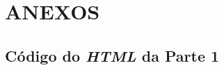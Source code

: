 \appendix

\part*{ANEXOS}

\chapter{Código do \emph{HTML} da Parte 1}
\label{appendix:a}













